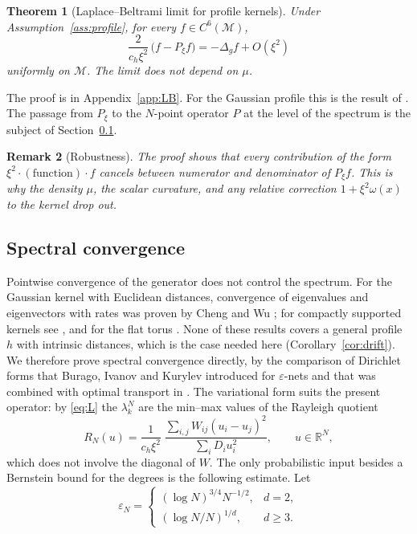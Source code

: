 \documentclass[11pt,a4paper]{article}
\theoremstyle{stmt}
\newtheorem{theorem}{Theorem}[section]
\theoremstyle{defn}
\theoremstyle{rmk}
\newtheorem{remark}[theorem]{Remark}
\numberwithin{equation}{section}
\newcommand{\M}{\mathcal{M}}
\newcommand{\R}{\mathbb{R}}
\begin{document}
\begin{theorem}[Laplace--Beltrami limit for profile kernels]\label{thm:LB}
Under Assumption~\ref{ass:profile}, for every $f\in C^6(\M)$,
\begin{equation}
\frac{2}{c_h\xi^2}\,\big(f-P_\xi f\big)=-\Delta_gf+O(\xi^2)
\end{equation}
uniformly on $\M$. The limit does not depend on $\mu$.
\end{theorem}

The proof is in Appendix~\ref{app:LB}. For the Gaussian profile this is the result of \cite{CoifmanLafon}. The passage from $P_\xi$ to the $N$-point operator $P$ at the level of the spectrum is the subject of Section~\ref{sec:spec}.

\begin{remark}[Robustness]\label{rem:robust}
The proof shows that every contribution of the form $\xi^2\cdot(\text{function})\cdot f$ cancels between numerator and denominator of $P_\xi f$. This is why the density $\mu$, the scalar curvature, and any relative correction $1+\xi^2\omega(x)$ to the kernel drop out.
\end{remark}

\subsection{Spectral convergence}\label{sec:spec}

Pointwise convergence of the generator does not control the spectrum. For the Gaussian kernel with Euclidean distances, convergence of eigenvalues and eigenvectors with rates was proven by Cheng and Wu \cite{ChengWu}; for compactly supported kernels see \cite{BIK,GTGHS}, and for the flat torus \cite{WormellReich}. None of these results covers a general profile $h$ with intrinsic distances, which is the case needed here (Corollary~\ref{cor:drift}). We therefore prove spectral convergence directly, by the comparison of Dirichlet forms that Burago, Ivanov and Kurylev \cite{BIK} introduced for $\varepsilon$-nets and that was combined with optimal transport in \cite{GTGHS}. The variational form suits the present operator: by \eqref{eq:L} the $\lambda_k^N$ are the min--max values of the Rayleigh quotient
\begin{equation}\label{eq:rayleigh}
R_N(u)=\frac{1}{c_h\xi^2}\;\frac{\sum_{i,j}W_{ij}(u_i-u_j)^2}{\sum_iD_iu_i^2},\qquad u\in\R^N,
\end{equation}
which does not involve the diagonal of $W$. The only probabilistic input besides a Bernstein bound for the degrees is the following estimate. Let
\begin{equation}\label{eq:epsN}
\varepsilon_N=\begin{cases}(\log N)^{3/4}N^{-1/2},& d=2,\\[2pt] (\log N/N)^{1/d},& d\ge3.\end{cases}
\end{equation}
\end{document}
